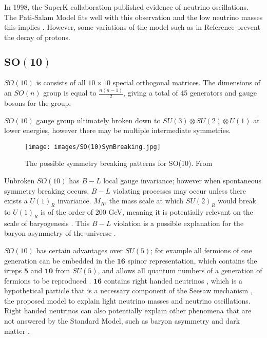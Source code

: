 \documentclass{article}
\begin{document}
In 1998, the SuperK collaboration published evidence of neutrino oscillations\cite{NeutrinoOscillations}. The Pati-Salam Model fits well with this observation \cite{PSVOsc}\cite{PSVOscOrig} and the low neutrino masses this implies \cite{SUSYSO10}\cite{PatiSalam}. However, some variations of the model such as in Reference \cite{PSVOscOrig} prevent the decay of protons. 

\subsection{$\bm{SO(10)}$}%
\label{sec:GUT_SO10}
$SO(10)$ is consists of all $10\times10$ special orthogonal matrices. The dimensions of an $SO(n)$ group is equal to $\frac{n(n-1)}{2}$, giving a total of 45 generators and gauge bosons for the group.

$SO(10)$ gauge group ultimately broken down to $SU(3)\otimes SU(2)\otimes U(1)$ at lower energies, however there may be multiple intermediate symmetries.
\begin{figure}
    \centering
    \label{fig:SO10}
    \texttt{[image: images/SO(10)SymBreaking.jpg]}
    \caption{The possible symmetry breaking patterns for SO(10). From \cite{SO10SymFig}}
\end{figure}

Unbroken $SO(10)$ has $B-L$ local gauge invariance; however when spontaneous symmetry breaking occurs, $B-L$ violating processes may occur unless there exists a $U(1)_R$ invariance. $M_R$, the mass scale at which $SU(2)_R$ would break to $U(1)_R$ is of the order of 200 GeV, meaning it is potentially relevant on the scale of baryogenesis \cite{GUTBaryonAsym}. This $B-L$ violation is a possible explanation for the baryon asymmetry of the universe \cite{SO10BaryonAsym}.

$SO(10)$ has certain advantages over $SU(5)$; for example all fermions of one generation can be embedded in the $\bm{16}$ spinor representation, which contains the irreps $\overline{\bm{5}}$ and $\bm{10}$ from $SU(5)$, and allows all quantum numbers of a generation of fermions to be reproduced \cite{SO10_2}. $\bm{16}$ contains right handed neutrinos \cite{SO10_1}\cite{SO10_2}, which is a hypothetical particle that is a necessary component of the Seesaw mechanism \cite{SeesawMechanism}, the proposed model to explain light neutrino masses and neutrino oscillations. Right handed neutrinos can also potentially explain other phenomena that are not answered by the Standard Model, such as baryon asymmetry and dark matter \cite{RHNeutrino}.
\end{document}
